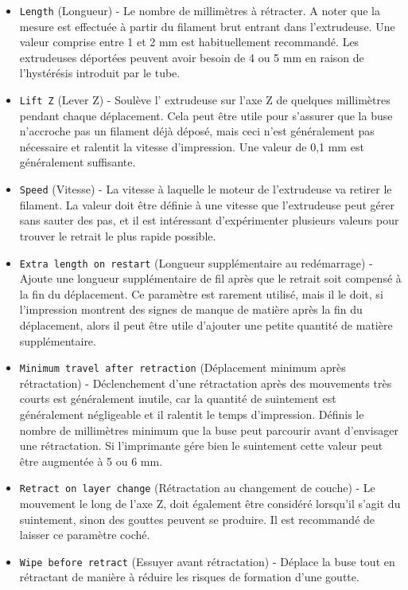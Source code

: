 \begin{itemize}
    \item \texttt{Length} (Longueur) - Le nombre de millim\`etres \`a r\'etracter. A noter que la mesure est effectu\'ee \`a partir du filament brut entrant dans l'extrudeuse. Une valeur comprise entre 1 et 2 mm est habituellement recommand\'e. Les extrudeuses d\'eport\'ees peuvent avoir besoin de 4 ou 5 mm en raison de l'hyst\'er\'esis introduit par le tube.
    \item \texttt{Lift Z} (Lever Z) - Soul\`eve l' extrudeuse sur l'axe Z de quelques millim\`etres pendant chaque d\'eplacement. Cela peut \^etre utile pour s'assurer que la buse n'accroche pas un filament d\'ej\`a d\'epos\'e, mais ceci n'est g\'en\'eralement pas n\'ecessaire et ralentit la vitesse d'impression. Une valeur de 0,1 mm est g\'en\'eralement suffisante.
    \item \texttt{Speed} (Vitesse) - La vitesse \`a laquelle le moteur de l'extrudeuse va retirer le filament. La valeur doit \^etre d\'efinie \`a une vitesse que l'extrudeuse peut g\'erer sans sauter des pas, et il est int\'eressant d'exp\'erimenter plusieurs valeurs pour trouver le retrait le plus rapide possible.
    \item \texttt{Extra length on restart} (Longueur suppl\'ementaire au red\'emarrage) -  Ajoute une longueur suppl\'ementaire de fil apr\`es que le retrait soit compens\'e \`a la fin du d\'eplacement. Ce param\`etre est rarement utilis\'e, mais il le doit, si l'impression montrent des signes de manque de mati\`ere apr\`es la fin du d\'eplacement, alors il peut \^etre utile d'ajouter une petite quantit\'e de mati\`ere suppl\'ementaire.
    \item \texttt{Minimum travel after retraction} (D\'eplacement minimum apr\`es r\'etractation) - D\'eclenchement d'une r\'etractation apr\`es des mouvements tr\`es courts est g\'en\'eralement inutile, car la quantit\'e de suintement est g\'en\'eralement n\'egligeable et il ralentit le temps d'impression.  D\'efinis le nombre de millim\`etres minimum que la buse peut parcourir avant d'envisager une r\'etractation.  Si l'imprimante g\'ere bien le suintement cette valeur peut \^etre augment\'ee \`a 5 ou 6 mm.
    \item \texttt{Retract on layer change} (R\'etractation au changement de couche) - Le mouvement le long de l'axe Z, doit \'egalement \^etre consid\'er\'e lorsqu'il s'agit du suintement, sinon des gouttes peuvent se produire. Il est recommand\'e de laisser ce param\`etre coch\'e.
    \item \texttt{Wipe before retract} (Essuyer avant r\'etractation) - D\'eplace la buse tout en r\'etractant de mani\`ere \`a r\'eduire les risques de formation d'une goutte.
\end{itemize}



